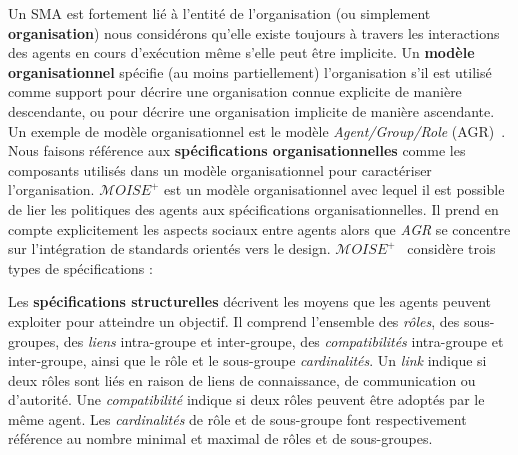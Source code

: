 \documentclass[contribution]{jfsma}
\begin{document}
Un SMA est fortement lié à l'entité de l'organisation (ou simplement \textbf{organisation}) nous considérons qu'elle existe toujours à travers les interactions des agents en cours d'exécution même s'elle peut être implicite.
%
%
Un \textbf{modèle organisationnel} spécifie (au moins partiellement) l'organisation s'il est utilisé comme support pour décrire une organisation connue explicite de manière descendante, ou pour décrire une organisation implicite de manière ascendante. Un exemple de modèle organisationnel est le modèle \emph{Agent/Group/Role} (AGR)~\cite{Ferber2004}. Nous faisons référence aux \textbf{spécifications organisationnelles} comme les composants utilisés dans un modèle organisationnel pour caractériser l'organisation. $\mathcal{M}OISE^+$ est un modèle organisationnel avec lequel il est possible de lier les politiques des agents aux spécifications organisationnelles. Il prend en compte explicitement les aspects sociaux entre agents alors que \emph{AGR} se concentre sur l'intégration de standards orientés vers le design. $\mathcal{M}OISE^+$~\cite{Hubner2007} considère trois types de spécifications :

Les \textbf{spécifications structurelles} décrivent les moyens que les agents peuvent exploiter pour atteindre un objectif. Il comprend l'ensemble des \emph{rôles}, des sous-groupes, des \emph{liens} intra-groupe et inter-groupe, des \emph{compatibilités} intra-groupe et inter-groupe, ainsi que le rôle et le sous-groupe \emph {cardinalités}.
Un \emph{link} indique si deux rôles sont liés en raison de liens de connaissance, de communication ou d'autorité. Une \emph{compatibilité} indique si deux rôles peuvent être adoptés par le même agent. Les \emph{cardinalités} de rôle et de sous-groupe font respectivement référence au nombre minimal et maximal de rôles et de sous-groupes.
\end{document}
